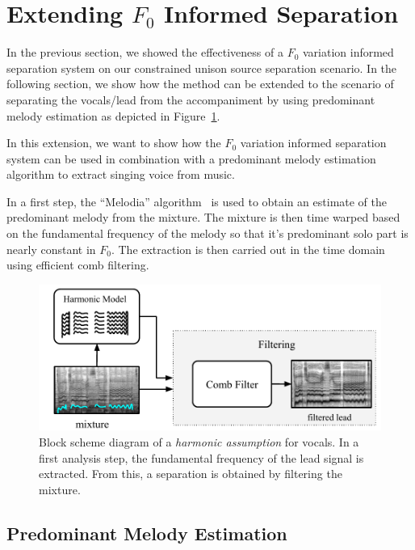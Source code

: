 \section{Extending $F_0$ Informed Separation}%
\label{sec:extendingf0}

In the previous section, we showed the effectiveness of a \(F_0\) variation informed separation system on our constrained unison source separation scenario.
In the following section, we show how the method can be extended to the scenario of separating the vocals/lead from the accompaniment by using predominant melody estimation as depicted in Figure~\ref{fig:methods_harmonicity}.

In this extension, we want to show how the \(F_0\) variation informed separation system can be used in combination with a predominant melody estimation algorithm to extract singing voice from music.

\par
In a first step, the ``Melodia'' algorithm~\cite{salamon12} is used to obtain an estimate of the predominant melody from the mixture.
The mixture is then time warped based on the fundamental frequency of the melody so that it’s predominant solo part is nearly constant in \(F_0\). The extraction is then carried out in the time domain using efficient comb filtering.

\begin{figure}[htbp]
    \centering
  \includegraphics[width=\columnwidth]{Chapters/05_Separation_Known/figures/comb_filter.pdf}
    \caption{Block scheme diagram of a \textit{harmonic assumption} for vocals. In a first analysis step, the fundamental frequency of the lead signal is extracted. From this, a separation is obtained by filtering the mixture.}
    \label{fig:methods_harmonicity}
\end{figure}

\subsection{Predominant Melody Estimation}

